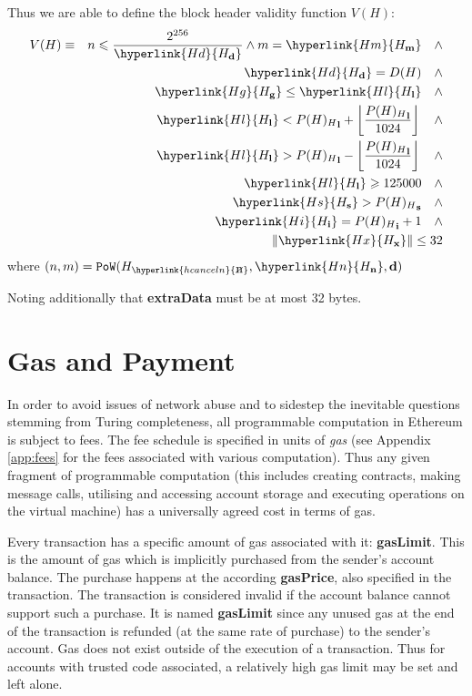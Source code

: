 \documentclass[9pt,oneside]{amsart}
\newcommand{\hcancel}[1]{%
    \tikz[baseline=(tocancel.base)]{
        \node[inner sep=0pt,outer sep=0pt] (tocancel) {#1};
        \draw[black] (tocancel.south west) -- (tocancel.north east);
    }%
}%
\begin{document}
\begin{multicols}{2}
Thus we are able to define the \hypertarget{BlockHeaderValidityFunction}{block header validity function $V(H)$}:\label{eq:BlockHeaderValidityFunction}
\begin{eqnarray}
V(H) & \equiv &  n \leqslant \frac{2^{256}}{\hyperlink{H d}{H_\mathbf{d}}} \wedge m = \hyperlink{H m}{H_\mathbf{m}} \quad \wedge \\
& & \hyperlink{H d}{H_\mathbf{d}} = D(H) \quad \wedge \\
& & \hyperlink{H g}{H_\mathbf{g}} \le \hyperlink{H l}{H_\mathbf{l}}  \quad \wedge \\
& & \hyperlink{H l}{H_\mathbf{l}} < {P(H)_H}_\mathbf{l} + \left\lfloor\frac{{P(H)_H}_\mathbf{l}}{1024}\right\rfloor  \quad \wedge \\
& & \hyperlink{H l}{H_\mathbf{l}} > {P(H)_H}_\mathbf{l} - \left\lfloor\frac{{P(H)_H}_\mathbf{l}}{1024}\right\rfloor  \quad \wedge \\
& & \hyperlink{H l}{H_\mathbf{l}} \geqslant 125000  \quad \wedge \\
& & \hyperlink{H s}{H_\mathbf{s}} > {P(H)_H}_\mathbf{s} \quad \wedge \\
& & \hyperlink{H i}{H_\mathbf{i}} = {P(H)_H}_\mathbf{i} +1 \quad \wedge \\
& & \lVert \hyperlink{H x}{H_\mathbf{x}} \rVert \le 32
\end{eqnarray}
where $(n, m) = \mathtt{PoW}(H_{\hyperlink{h cancel n}{\hcancel{n}}}, \hyperlink{H n}{H_\mathbf{n}}, \mathbf{d})$

Noting additionally that \textbf{extraData} must be at most 32 bytes.

\section{Gas and Payment} \label{ch:payment}

In order to avoid issues of network abuse and to sidestep the inevitable questions stemming from Turing completeness, all programmable computation in Ethereum is subject to fees. The fee schedule is specified in units of \textit{gas} (see Appendix \ref{app:fees} for the fees associated with various computation). Thus any given fragment of programmable computation (this includes creating contracts, making message calls, utilising and accessing account storage and executing operations on the virtual machine) has a universally agreed cost in terms of gas.

Every transaction has a specific amount of gas associated with it: \textbf{gasLimit}. This is the amount of gas which is implicitly purchased from the sender's account balance. The purchase happens at the according \textbf{gasPrice}, also specified in the transaction. The transaction is considered invalid if the account balance cannot support such a purchase. It is named \textbf{gasLimit} since any unused gas at the end of the transaction is refunded (at the same rate of purchase) to the sender's account. Gas does not exist outside of the execution of a transaction. Thus for accounts with trusted code associated, a relatively high gas limit may be set and left alone.


\end{multicols}
\end{document}
